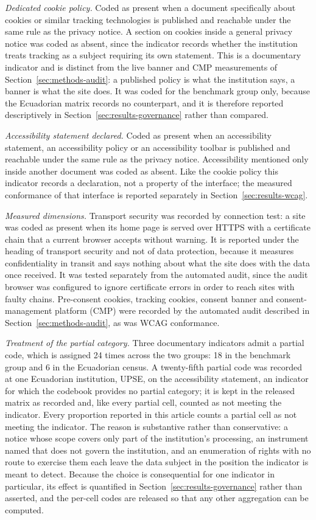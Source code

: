 \documentclass[]{interact}
\begin{document}
\emph{Dedicated cookie policy.} Coded as present when a document specifically about cookies or similar tracking technologies is published and reachable under the same rule as the privacy notice. A section on cookies inside a general privacy notice was coded as absent, since the indicator records whether the institution treats tracking as a subject requiring its own statement. This is a documentary indicator and is distinct from the live banner and CMP measurements of Section~\ref{sec:methods-audit}: a published policy is what the institution says, a banner is what the site does. It was coded for the benchmark group only, because the Ecuadorian matrix records no counterpart, and it is therefore reported descriptively in Section~\ref{sec:results-governance} rather than compared.

\emph{Accessibility statement declared.} Coded as present when an accessibility statement, an accessibility policy or an accessibility toolbar is published and reachable under the same rule as the privacy notice. Accessibility mentioned only inside another document was coded as absent. Like the cookie policy this indicator records a declaration, not a property of the interface; the measured conformance of that interface is reported separately in Section~\ref{sec:results-wcag}.

\emph{Measured dimensions.} Transport security was recorded by connection test: a site was coded as present when its home page is served over HTTPS with a certificate chain that a current browser accepts without warning. It is reported under the heading of transport security and not of data protection, because it measures confidentiality in transit and says nothing about what the site does with the data once received. It was tested separately from the automated audit, since the audit browser was configured to ignore certificate errors in order to reach sites with faulty chains. Pre-consent cookies, tracking cookies, consent banner and consent-management platform (CMP) were recorded by the automated audit described in Section~\ref{sec:methods-audit}, as was WCAG conformance.

\emph{Treatment of the partial category.} Three documentary indicators admit a partial code, which is assigned 24 times across the two groups: 18 in the benchmark group and 6 in the Ecuadorian census. A twenty-fifth partial code was recorded at one Ecuadorian institution, UPSE, on the accessibility statement, an indicator for which the codebook provides no partial category; it is kept in the released matrix as recorded and, like every partial cell, counted as not meeting the indicator. Every proportion reported in this article counts a partial cell as not meeting the indicator. The reason is substantive rather than conservative: a notice whose scope covers only part of the institution's processing, an instrument named that does not govern the institution, and an enumeration of rights with no route to exercise them each leave the data subject in the position the indicator is meant to detect. Because the choice is consequential for one indicator in particular, its effect is quantified in Section~\ref{sec:results-governance} rather than asserted, and the per-cell codes are released so that any other aggregation can be computed.
\end{document}
